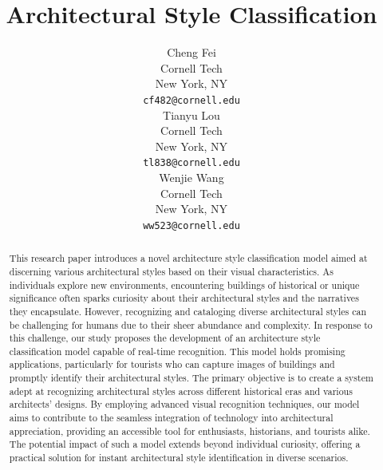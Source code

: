 \documentclass{article}
\title{Architectural Style Classification}
\author{
    {\hspace{1mm}Cheng Fei} \\
	Cornell Tech\\
	New York, NY \\
	\texttt{cf482@cornell.edu} \\
    \And
    {\hspace{1mm}Tianyu Lou} \\
	Cornell Tech\\
	New York, NY \\
	\texttt{tl838@cornell.edu} \\
	\And
	{\hspace{1mm}Wenjie Wang} \\
	Cornell Tech\\
	New York, NY \\
	\texttt{ww523@cornell.edu} \\
}
\begin{document}
\maketitle

\begin{abstract}
    This research paper introduces a novel architecture style classification model aimed at discerning various architectural styles based on their visual characteristics. As individuals explore new environments, encountering buildings of historical or unique significance often sparks curiosity about their architectural styles and the narratives they encapsulate. However, recognizing and cataloging diverse architectural styles can be challenging for humans due to their sheer abundance and complexity. In response to this challenge, our study proposes the development of an architecture style classification model capable of real-time recognition. This model holds promising applications, particularly for tourists who can capture images of buildings and promptly identify their architectural styles. The primary objective is to create a system adept at recognizing architectural styles across different historical eras and various architects' designs. By employing advanced visual recognition techniques, our model aims to contribute to the seamless integration of technology into architectural appreciation, providing an accessible tool for enthusiasts, historians, and tourists alike. The potential impact of such a model extends beyond individual curiosity, offering a practical solution for instant architectural style identification in diverse scenarios.
\end{abstract}


\end{document}
